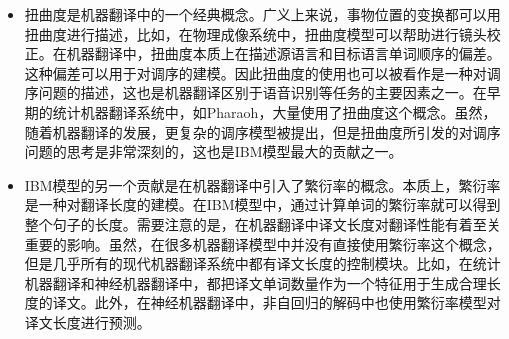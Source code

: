 \begin{itemize}
\vspace{0.5em}
\item 扭曲度是机器翻译中的一个经典概念。广义上来说，事物位置的变换都可以用扭曲度进行描述，比如，在物理成像系统中，扭曲度模型可以帮助进行镜头校正。在机器翻译中，扭曲度本质上在描述源语言和目标语言单词顺序的偏差。这种偏差可以用于对调序的建模。因此扭曲度的使用也可以被看作是一种对调序问题的描述，这也是机器翻译区别于语音识别等任务的主要因素之一。在早期的统计机器翻译系统中，如Pharaoh，大量使用了扭曲度这个概念。虽然，随着机器翻译的发展，更复杂的调序模型被提出，但是扭曲度所引发的对调序问题的思考是非常深刻的，这也是IBM模型最大的贡献之一。

\vspace{0.5em}
\item IBM模型的另一个贡献是在机器翻译中引入了繁衍率的概念。本质上，繁衍率是一种对翻译长度的建模。在IBM模型中，通过计算单词的繁衍率就可以得到整个句子的长度。需要注意的是，在机器翻译中译文长度对翻译性能有着至关重要的影响。虽然，在很多机器翻译模型中并没有直接使用繁衍率这个概念，但是几乎所有的现代机器翻译系统中都有译文长度的控制模块。比如，在统计机器翻译和神经机器翻译中，都把译文单词数量作为一个特征用于生成合理长度的译文。此外，在神经机器翻译中，非自回归的解码中也使用繁衍率模型对译文长度进行预测。

\vspace{0.5em}
\end{itemize}

















